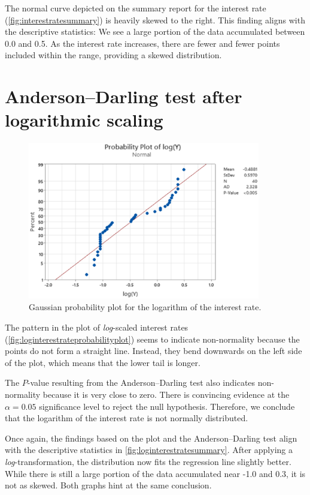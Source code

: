 \documentclass[12pt]{article}
\begin{document}
The normal curve depicted on the summary report for the interest rate (\autoref{fig:interestratesummary}) is heavily skewed to the right. This finding aligns with the descriptive statistics: We see a large portion of the data accumulated between 0.0 and 0.5. As the interest rate increases, there are fewer and fewer points included within the range, providing a skewed distribution.
\section{Anderson--Darling test after logarithmic scaling}
\begin{figure}[h]
\begin{center}
\includegraphics[width=4in]{images/log-interest-rate-probability-plot.png}
\end{center}
\caption{Gaussian probability plot for the logarithm of the interest rate. \label{fig:loginterestrateprobabilityplot}}
\end{figure}
The pattern in the plot of \textit{log}-scaled interest rates (\autoref{fig:loginterestrateprobabilityplot}) seems to indicate non-normality because the points do not form a straight line. Instead, they bend downwards on the left side of the plot, which means that the lower tail is longer.

The $P$-value resulting from the Anderson--Darling test also indicates non-normality because it is very close to zero. There is convincing evidence at the $\alpha=0.05$ significance level to reject the null hypothesis. Therefore, we conclude that the logarithm of the interest rate is not normally distributed.

Once again, the findings based on the plot and the Anderson--Darling test align with the descriptive statistics in \autoref{fig:loginterestratesummary}. After applying a \textit{log}-transformation, the distribution now fits the regression line slightly better. While there is still a large portion of the data accumulated near -1.0 and 0.3, it is not as skewed. Both graphs hint at the same conclusion.
\end{document}

